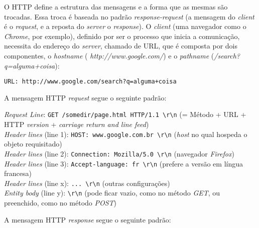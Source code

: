 O HTTP define a estrutura das mensagens e a forma que as mesmas são
trocadas. Essa troca é baseada no padrão \emph{response-request} (a
mensagem do \emph{client} é o \emph{request}, e a reposta do
\emph{server} o \emph{response}). O \emph{client} (uma navegador como o
\emph{Chrome}, por exemplo), definido por ser o processo que inicia a
comunicação, necessita do endereço do \emph{server}, chamado de URL, que
é composta por dois componentes, o \emph{hostname} (
\emph{http://www.google.com/}) e o \emph{pathname}
(\emph{/search?q=alguma+coisa}):

\begin{verbatim}
URL: http://www.google.com/search?q=alguma+coisa
\end{verbatim}

A mensagem HTTP \emph{request} segue o seguinte padrão:

\emph{Request Line}:
\texttt{GET\ /somedir/page.html\ HTTP/1.1\ \textbackslash{}r\textbackslash{}n}
(= Método + URL + HTTP \emph{version} + \emph{carriage return and line
feed})\\
\emph{Header lines} (line 1):
\texttt{HOST:\ www.google.com.br\ \textbackslash{}r\textbackslash{}n}
(\emph{host} no qual hospeda o objeto requisitado)\\
\emph{Header lines} (line 2):
\texttt{Connection:\ Mozilla/5.0\ \textbackslash{}r\textbackslash{}n}
(navegador \emph{Firefox})\\
\emph{Header lines} (line 3):
\texttt{Accept-language:\ fr\ \textbackslash{}r\textbackslash{}n}
(prefere a versão em língua francesa)\\
\emph{Header lines} (line x):
\texttt{...\ \textbackslash{}r\textbackslash{}n} (outras
configurações)\\
\emph{Entity body} (line y): \texttt{\textbackslash{}r\textbackslash{}n}
(pode ficar vazio, como no método \emph{GET}, ou preenchido, como no
método \emph{POST})

A mensagem HTTP \emph{response} segue o seguinte padrão:

